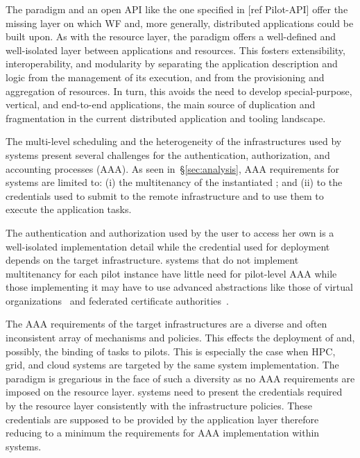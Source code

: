 \documentclass{sig-alternate}
\begin{document}
The \pilot paradigm and an open \pilot API like the one specified in [ref
Pilot-API] offer the missing layer on which WF and, more generally, distributed
applications could be built upon. As with the resource layer, the \pilot
paradigm offers a well-defined and well-isolated layer between applications and
resources. This fosters extensibility, interoperability, and modularity by
separating the application description and logic from the management of its
execution, and from the provisioning and aggregation of resources. In turn, this
avoids the need to develop special-purpose, vertical, and end-to-end
applications, the main source of duplication and fragmentation in the current
distributed application and tooling landscape.


The multi-level scheduling and the heterogeneity of the infrastructures used by
\pilot systems present several challenges for the authentication, authorization,
and accounting processes (AAA). As seen in~\S\ref{sec:analysis}, AAA
requirements for \pilot systems are limited to: (i) the multitenancy of the
instantiated \pilots; and (ii) to the credentials used to submit \pilots to the
remote infrastructure and to use them to execute the application tasks.

The authentication and authorization used by the user to access her own \pilots
is a well-isolated implementation detail while the credential used for \pilot
deployment depends on the target infrastructure. \pilot systems that do not
implement multitenancy for each pilot instance have little need for pilot-level
AAA while those implementing it may have to use advanced abstractions like those
of virtual organizations~\cite{foster2001} and federated certificate
authorities~\cite{horwitz2002}.

The AAA requirements of the target infrastructures are a diverse and often
inconsistent array of mechanisms and policies. This effects the deployment of
\pilots and, possibly, the binding of tasks to pilots. This is especially the
case when HPC, grid, and cloud systems are targeted by the same \pilot system
implementation. The \pilot paradigm is gregarious in the face of such a
diversity as no AAA requirements are imposed on the resource layer. \pilot
systems need to present the credentials required by the resource layer
consistently with the infrastructure policies. These credentials are supposed to
be provided by the application layer therefore reducing to a minimum the
requirements for AAA implementation within \pilot systems.
\end{document}
